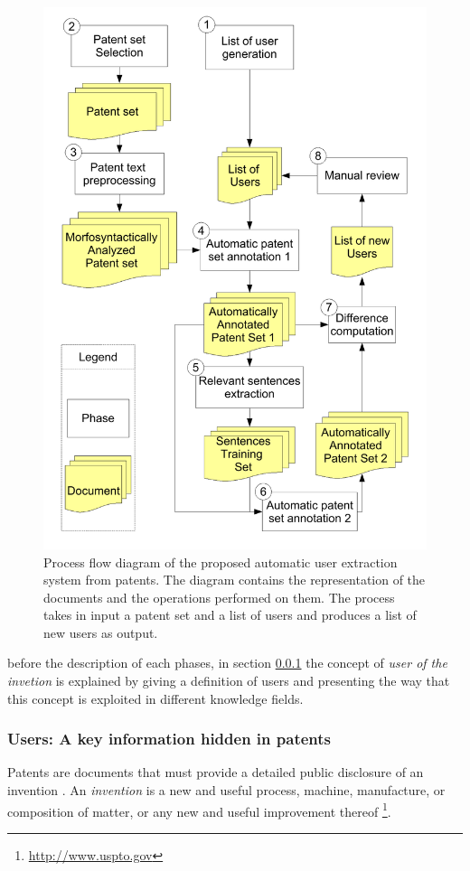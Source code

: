 \documentclass[]{book}
\let\rmarkdownfootnote\footnote%
\def\footnote{\protect\rmarkdownfootnote}
\begin{document}
\begin{figure}

{\centering \includegraphics[width=0.8\linewidth]{_bookdown_files/figures/Process} 

}

\caption{Process flow diagram of the proposed automatic user extraction system from patents. The diagram contains the representation of the documents and the operations performed on them. The process takes in input a patent set and a list of users and produces a list of new users as output.}\label{fig:procesuser}
\end{figure}

before the description of each phases, in section \ref{userdef} the
concept of \emph{user of the invetion} is explained by giving a
definition of users and presenting the way that this concept is
exploited in different knowledge fields.

\subsubsection{Users: A key information hidden in
patents}\label{userdef}

Patents are documents that must provide a detailed public disclosure of
an invention \citep{wipo2}. An \emph{invention} is a new and useful
process, machine, manufacture, or composition of matter, or any new and
useful improvement thereof \footnote{\url{http://www.uspto.gov}}.
\end{document}
